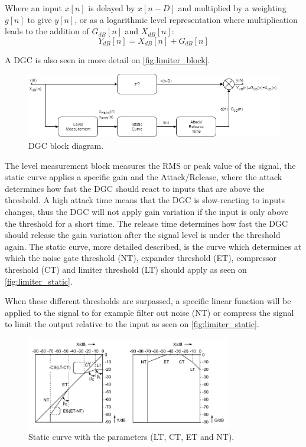 Where an input $x[n]$ is delayed by $x[n-D]$ and multiplied by a weighting $g[n]$ to give $y[n]$, or as a logarithmic level representation where multiplication leads to the addition of $G_{dB}[n]$ and $X_{dB}[n]$:
\begin{equation}
Y_{dB}[n] = X_{dB}[n] + G_{dB}[n]
\end{equation}

A DGC is also seen in more detail on \autoref{fig:limiter_block}.

\begin{figure}[H]
\centering
\includegraphics[width=1\textwidth]{figures/Limiter_block.png}
\caption{DGC block diagram.}
\label{fig:limiter_block}
\end{figure}   


The level measurement block measures the RMS or peak value of the signal, the static curve applies a specific gain and the Attack/Release, where the attack determines how fast the DGC should react to inputs that are above the threshold. A high attack time means that the DGC is slow-reacting to inputs changes, thus the DGC will not apply gain variation if the input is only above the threshold for a short time. The release time determines how fast the DGC should release the gain variation after the signal level is under the threshold again.
The static curve, more detailed described, is the curve which determines at which the noise gate threshold (NT), expander threshold (ET), compressor threshold (CT) and limiter threshold (LT) should apply as seen on \autoref{fig:limiter_static}. 

When these different thresholds are surpassed, a specific linear function will be applied to the signal to for example filter out noise (NT) or compress the signal to limit the output relative to the input as seen on \autoref{fig:limiter_static}. 

\begin{figure}[H]
\centering
\includegraphics[width=0.8\textwidth]{figures/limiter_static_curve.png}
\caption{Static curve with the parameters (LT, CT, ET and NT).}
\label{fig:limiter_static}
\end{figure}  

